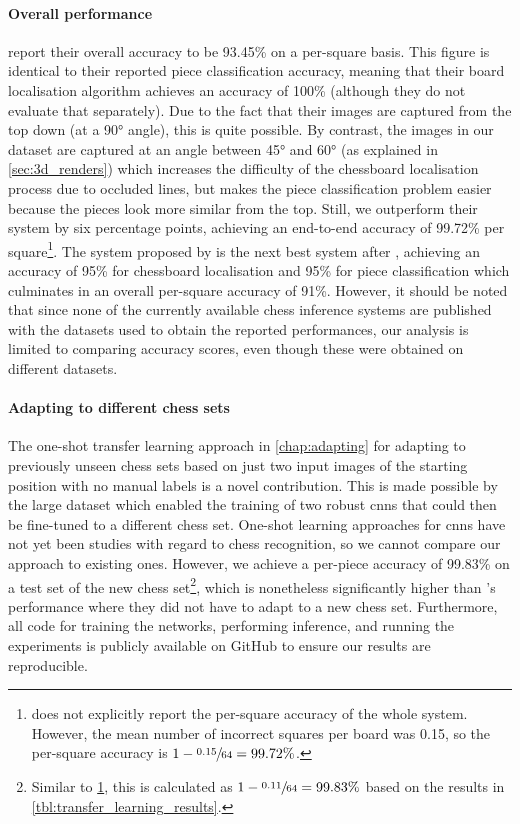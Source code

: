 \documentclass[../main.tex]{subfiles}
\begin{document}
\paragraph{Overall performance}
\Textcite{mehta2020} report their overall accuracy to be 93.45\% on a per-square basis.
This figure is identical to their reported piece classification accuracy, meaning that their board localisation algorithm achieves an accuracy of 100\% (although they do not evaluate that separately).
Due to the fact that their images are captured from the top down (at a 90° angle), this is quite possible.
By contrast, the images in our dataset are captured at an angle between 45° and 60° (as explained in \cref{sec:3d_renders}) which increases the difficulty of the chessboard localisation process due to occluded lines, but makes the piece classification problem easier because the pieces look more similar from the top.
Still, we outperform their system by six percentage points, achieving an end-to-end accuracy of 99.72\% per square\footnote{
    \label{ft:per_piece}
     does not explicitly report the per-square accuracy of the whole system.
    However, the mean number of incorrect squares per board was 0.15, so the per-square accuracy is $1-\sfrac{0.15}{64}=99.72\%$.
}.
The system proposed by \Textcite{czyzewski2020} is the next best system after \cite{mehta2020}, achieving an accuracy of 95\% for chessboard localisation and 95\% for piece classification which culminates in an overall per-square accuracy of 91\%.
However, it should be noted that since none of the currently available chess inference systems are published with the datasets used to obtain the reported performances, our analysis is limited to comparing accuracy scores, even though these were obtained on different datasets.

\paragraph{Adapting to different chess sets}
The one-shot transfer learning approach in \cref{chap:adapting} for adapting to previously unseen chess sets based on just two input images of the starting position with no manual labels is a novel contribution.
This is made possible by the large dataset which enabled the training of two robust \glspl{cnn} that could then be fine-tuned to a different chess set.
One-shot learning approaches for \glspl{cnn} have not yet been studies with regard to chess recognition, so we cannot compare our approach to existing ones.
However, we achieve a per-piece accuracy of 99.83\% on a test set of the new chess set\footnote{
    Similar to \cref{ft:per_piece}, this is calculated as $1-\sfrac{0.11}{64}=99.83\%$ based on the results in \cref{tbl:transfer_learning_results}.
}, which is nonetheless significantly higher than \textcite{mehta2020}'s performance where they did not have to adapt to a new chess set.
Furthermore, all code for training the networks, performing inference, and running the experiments is publicly available on GitHub to ensure our results are reproducible.

\ifSubfilesClassLoaded{%
\printglossary[type=\acronymtype]%
\printbibliography%
}{}%
\end{document}
